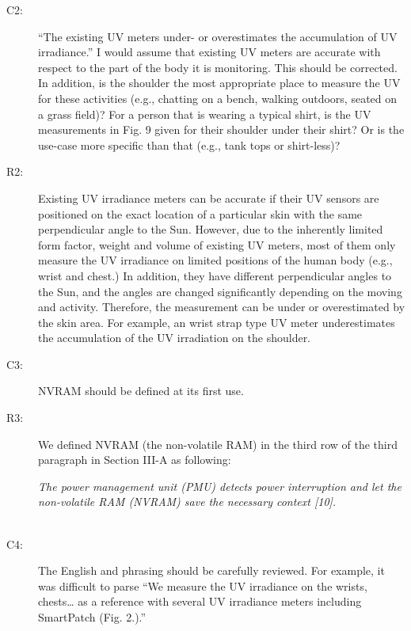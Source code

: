 \documentclass[onecolumn]{IEEEconf}
\begin{document}
\begin{description}
\item [C2: ] ``The existing UV meters under- or overestimates the accumulation of UV irradiance.'' I would assume that existing UV meters are accurate with respect to the part of the body it is monitoring. This should be corrected. In addition, is the shoulder the most appropriate place to measure the UV for these activities (e.g., chatting on a bench, walking outdoors, seated on a grass field)? For a person that is wearing a typical shirt, is the UV measurements in Fig. 9 given for their shoulder under their shirt? Or is the use-case more specific than that (e.g., tank tops or shirt-less)?
\item [R2: ] 
Existing UV irradiance meters can be accurate if their UV sensors are positioned on the exact location of a particular skin with the same perpendicular angle to the Sun. However, due to the inherently limited form factor, weight and volume of existing UV meters, most of them only measure the UV irradiance on limited positions of the human body (e.g., wrist and chest.) In addition, they have different perpendicular angles to the Sun, and the angles are changed significantly depending on the moving and activity. Therefore, the measurement can be under or overestimated by the skin area. For example, an wrist strap type UV meter underestimates the accumulation of the UV irradiation on the shoulder. 
~\\

\item [C3: ] NVRAM should be defined at its first use.
\item [R3: ] We defined NVRAM (the non-volatile RAM) in the third row of the third paragraph in Section III-A as following:

\textit{The power management unit (PMU) detects power interruption and let the non-volatile RAM (NVRAM) save the necessary context [10].}\\
~\\

\item [C4:] The English and phrasing should be carefully reviewed. For example, it was difficult to parse ``We measure the UV irradiance on the wrists, chests… as a reference with several UV irradiance meters including SmartPatch (Fig. 2.).'' 


\end{description}
\end{document}
